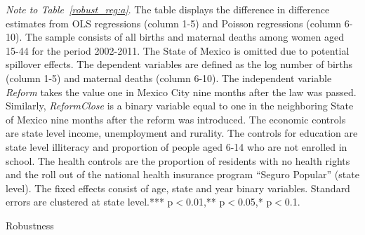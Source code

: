 \documentclass[a4paper, 11pt]{article}
\begin{document}
\begin{spacing}{1.4}
\begin{table}
\begin{threeparttable}
    
    \begin{tablenotes}  \footnotesize \item \textit{Note to Table~\ref{robust_reg:a}}. The table displays the difference in difference estimates from OLS regressions (column 1-5) and Poisson regressions (column 6-10). The sample consists of all births and maternal deaths among women aged 15-44 for the period 2002-2011. The State of Mexico is omitted due to potential spillover effects. The dependent variables are defined as the log number of births (column 1-5) and maternal deaths (column 6-10). The independent variable \textit{Reform} takes the value one in Mexico City nine months after the law was passed. Similarly, \textit{ReformClose} is a binary variable equal to one in the neighboring State of Mexico nine months after the reform was introduced. The economic controls are state level income, unemployment and rurality. The controls for education are state level illiteracy and proportion of people aged 6-14 who are not enrolled in school. The health controls are the proportion of residents with no health rights and the roll out of the national health insurance program ``Seguro Popular'' (state level). The fixed effects consist of age, state and year binary variables. Standard errors are clustered at state level.*** p$<$0.01,** p$<$0.05,* p$<$0.1.	 
    \end{tablenotes} 
  \end{threeparttable}
\end{table}
 
 
 \begin{table}\centering  \caption{Robustness} \label{robust_reg:b}
 	\begin{threeparttable}
 	
  
 			{\footnotesize 	}
 	 

\end{threeparttable}
\end{table}
\end{spacing}
\end{document}
